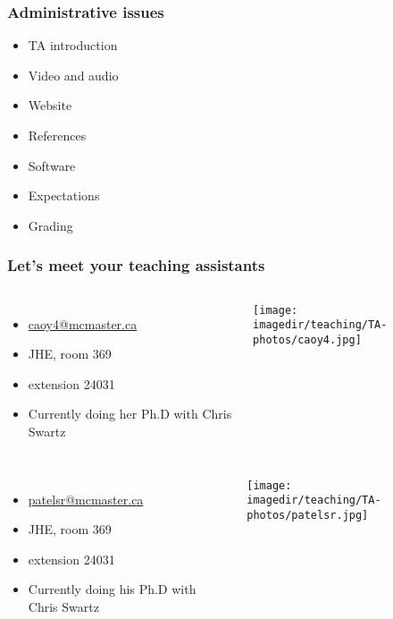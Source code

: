 \begin{frame}\frametitle{Administrative issues}
	\begin{itemize}
		\item	TA introduction
		\item	Video and audio
		\item	Website
		\item	References
		\item	Software
		\item	Expectations
		\item	Grading
	\end{itemize}
\end{frame}

\begin{frame}\frametitle{Let's meet your teaching assistants}
	\vspace{12pt}
	\begin{columns}[t]
			{\color{myGreen}{Yanan Cao}}
			\begin{itemize}
				\item	\url{caoy4@mcmaster.ca}
				\item	JHE, room 369
				\item	extension  24031
				\item	Currently doing her Ph.D with Chris Swartz
			\end{itemize}
			\vspace{-1cm}
			\begin{center}
				\texttt{[image: \\imagedir/teaching/TA-photos/caoy4.jpg]}
			\end{center}
	\end{columns}
		
	
	\vspace{12pt}
	\begin{columns}[t]
			{\color{myGreen}{Shailesh Patel}}
			\begin{itemize}
				\item	\url{patelsr@mcmaster.ca}
				\item	JHE, room 369
				\item	extension 24031
				\item	Currently doing his Ph.D with Chris Swartz
			\end{itemize}
			\vspace{-1cm}
			\begin{center}
				\texttt{[image: \\imagedir/teaching/TA-photos/patelsr.jpg]}
			\end{center}
	\end{columns}
	\vspace{24pt}

	{\color{myOrange}{Office hours for both TAs are by email appointment}}
\end{frame}

